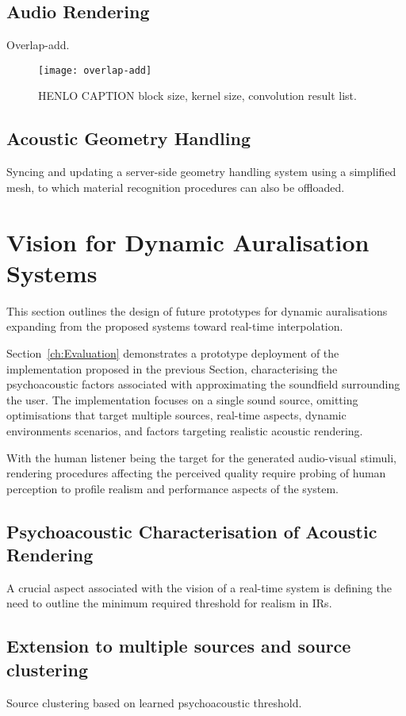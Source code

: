 \subsection{Audio Rendering}
Overlap-add.
\begin{figure}[htb]
    \centering
    \texttt{[image: overlap-add]}
    \caption{HENLO CAPTION block size, kernel size, convolution result list.}
\label{fig:overlap-add}
\end{figure}


\subsection{Acoustic Geometry Handling}
Syncing and updating a server-side geometry handling system using a simplified mesh, to which material recognition procedures can also be offloaded.

\section{Vision for Dynamic Auralisation Systems}
This section outlines the design of future prototypes for dynamic auralisations expanding from the proposed systems toward real-time interpolation.\par
Section~\ref{ch:Evaluation} demonstrates a prototype deployment of the implementation proposed in the previous Section, characterising the psychoacoustic factors associated with approximating the soundfield surrounding the user. The implementation focuses on a single sound source, omitting optimisations that target multiple sources, real-time aspects, dynamic environments scenarios, and factors targeting realistic acoustic rendering.\par
With the human listener being the target for the generated audio-visual stimuli, rendering procedures affecting the perceived quality require probing of human perception to profile realism and performance aspects of the system. 


\subsection{Psychoacoustic Characterisation of Acoustic Rendering}
A crucial aspect associated with the vision of a real-time system is defining the need to outline the minimum required threshold for realism in IRs.

\subsection{Extension to multiple sources and source clustering}
Source clustering based on learned psychoacoustic threshold.

